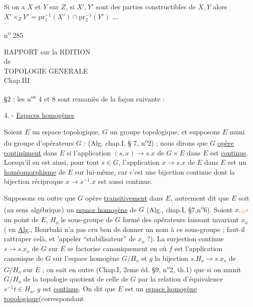 Si on a $X$ et $Y$ sur $Z$, si $X',Y'$ sont des parties constructibles de $X,Y$ alors $X'\times_Z Y'=\mathrm{pr}_1^{-1}(X')\cap\mathrm{pr}_2^{-1}(Y')$ \ldots.


\hfill n\textsuperscript{o} 285

\begin{center}
RAPPORT sur la RDITION\\
de\\
TOPOLOGIE GENERALE\\
Chap.III
\end{center}

§2 ; les n\textsuperscript{os} 4 et 8 sont remaniès de la façon suivante :

4. - \uline{Espaces homogènes}

Soient $E$ un espace topologique, $G$ un groupe topologique, et supposons $E$ muni du groupe d'opérateurs $G$ : (Alg. chap.I, § 7, n\textsuperscript{o}2) ; nous dirons que $G$ \uline{opère continûment} dans $E$ si l'application $(s,x)\to s.x$ de $G\times E$ dans $E$ est \uline{continue}. Lorsqu'il en est ainsi, pour tout $s\in G$, l'application $x\longrightarrow s.x$ de $E$ dans $E$ est un \uline{homéomorphisme} de $E$ sur lui-même, car c'est une bijection continue dont la bijection réciproque $x\longrightarrow s^{-1}.x$ est aussi continue.

Supposons en outre que $G$ opère \uline{transitivement} dans $E$, autrement dit que $E$ soit (au sens algébrique) un \uline{espace homogène} de $G$ (Alg., chap.I, §7,n\textsuperscript{o}6). Soient $x_{\unsure{o|0}}$ un point de $E$, $H_o$ le sous-groupe de $G$ formé des opérateurs laissant invariant $x_o$ ( en \uline{Alg}., Bourbaki n'a pas cru bon de donner un nom à ce sous-groupe ; faut-il rattraper celà, et 'appeler ``stabilisateur'' de $x_o$ ?). La surjection continue $s\longrightarrow s.x_o$ de $G$ sur $E$ se factorise canoniquement en
où $f$ est l'application canonique de $G$ sur l'espace homogène $G/H_o$ et $g$ la bijection $s.H_o\to s.x_o$ de $G/H_o$ sur $E$ ; on sait en outre (Chap.I, 2eme éd. §9, n\textsuperscript{o}2, th.1) que si on munit $G/H_o$ de la topologie quotient de celle de $G$ par la relation d'équivalence $s^{-1}t\in H_o$, $g$ est \uline{continue}. On dit que $E$ est un \uline{espace homogène topologique}(correspondant

